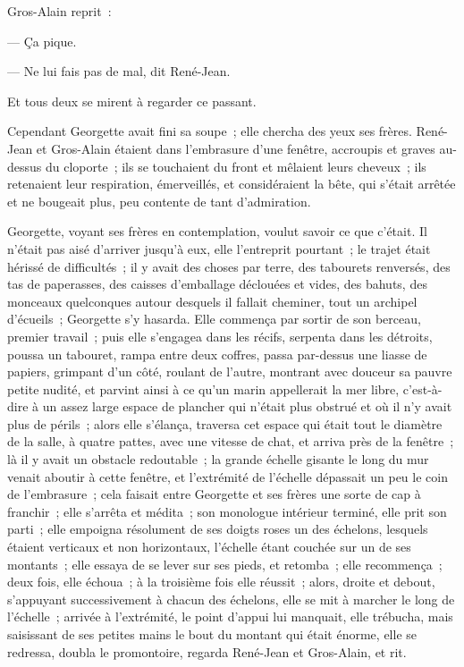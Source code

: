 \documentclass[french,twoside]{book} %
\begin{document}
Gros-Alain reprit :\par
— Ça pique.\par
— Ne lui fais pas de mal, dit René-Jean.\par
Et tous deux se mirent à regarder ce passant.\par
Cependant Georgette avait fini sa soupe ; elle chercha des yeux ses frères. René-Jean et Gros-Alain étaient dans l’embrasure d’une fenêtre, accroupis et  graves au-dessus du cloporte ; ils se touchaient du front et mêlaient leurs cheveux ; ils retenaient leur respiration, émerveillés, et considéraient la bête, qui s’était arrêtée et ne bougeait plus, peu contente de tant d’admiration.\par
Georgette, voyant ses frères en contemplation, voulut savoir ce que c’était. Il n’était pas aisé d’arriver jusqu’à eux, elle l’entreprit pourtant ; le trajet était hérissé de difficultés ; il y avait des choses par terre, des tabourets renversés, des tas de paperasses, des caisses d’emballage déclouées et vides, des bahuts, des monceaux quelconques autour desquels il fallait cheminer, tout un archipel d’écueils ; Georgette s’y hasarda. Elle commença par sortir de son berceau, premier travail ; puis elle s’engagea dans les récifs, serpenta dans les détroits, poussa un tabouret, rampa entre deux coffres, passa par-dessus une liasse de papiers, grimpant d’un côté, roulant de l’autre, montrant avec douceur sa pauvre petite nudité, et parvint ainsi à ce qu’un marin appellerait la mer libre, c’est-à-dire à un assez large espace de plancher qui n’était plus obstrué et où il n’y avait plus de périls ; alors elle s’élança, traversa cet espace qui était tout le diamètre de la salle, à quatre pattes, avec une vitesse de chat, et arriva près de la fenêtre ; là il y avait un obstacle redoutable ; la grande échelle gisante le long du mur venait aboutir à cette fenêtre, et l’extrémité de l’échelle dépassait un peu le coin de l’embrasure ; cela faisait entre Georgette et ses frères une sorte de cap à franchir ; elle s’arrêta et médita ; son monologue intérieur  terminé, elle prit son parti ; elle empoigna résolument de ses doigts roses un des échelons, lesquels étaient verticaux et non horizontaux, l’échelle étant couchée sur un de ses montants ; elle essaya de se lever sur ses pieds, et retomba ; elle recommença ; deux fois, elle échoua ; à la troisième fois elle réussit ; alors, droite et debout, s’appuyant successivement à chacun des échelons, elle se mit à marcher le long de l’échelle ; arrivée à l’extrémité, le point d’appui lui manquait, elle trébucha, mais saisissant de ses petites mains le bout du montant qui était énorme, elle se redressa, doubla le promontoire, regarda René-Jean et Gros-Alain, et rit.
\end{document}
